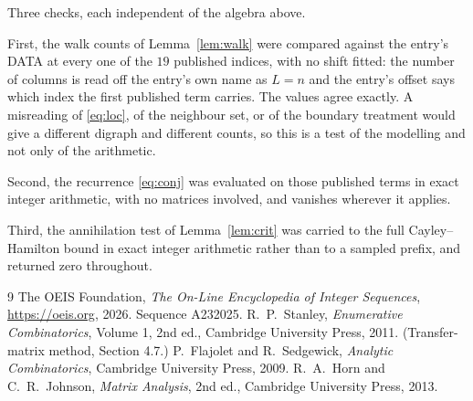 \documentclass[11pt,a4paper]{article}
\theoremstyle{plain}
\theoremstyle{definition}
\begin{document}
Three checks, each independent of the algebra above.

First, the walk counts of Lemma~\ref{lem:walk} were compared against the entry's DATA at
every one of the $19$ published indices, with no shift fitted: the number of columns is
read off the entry's own name as $L=n$ and the entry's offset says which index the first
published term carries. The values agree exactly. A misreading of \eqref{eq:loc}, of the
neighbour set, or of the boundary treatment would give a different digraph and different
counts, so this is a test of the modelling and not only of the arithmetic.

Second, the recurrence \eqref{eq:conj} was evaluated on those published terms in exact
integer arithmetic, with no matrices involved, and vanishes wherever it applies.

Third, the annihilation test of Lemma~\ref{lem:crit} was carried to the full
Cayley--Hamilton bound in exact integer arithmetic rather than to a sampled prefix, and
returned zero throughout.

\begin{thebibliography}{9}
 The OEIS Foundation, \emph{The On-Line Encyclopedia of Integer
Sequences}, \url{https://oeis.org}, 2026. Sequence A232025.
 R.~P.~Stanley, \emph{Enumerative Combinatorics}, Volume 1, 2nd ed.,
Cambridge University Press, 2011. (Transfer-matrix method, Section 4.7.)
 P.~Flajolet and R.~Sedgewick, \emph{Analytic Combinatorics}, Cambridge
University Press, 2009.
 R.~A.~Horn and C.~R.~Johnson, \emph{Matrix Analysis}, 2nd ed., Cambridge
University Press, 2013.
\end{thebibliography}
\end{document}
